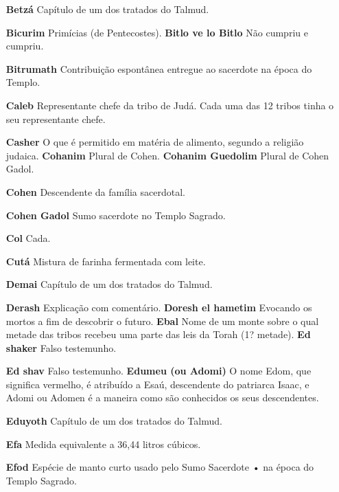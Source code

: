 \begin{itemize}
\begin{enumrate}
\begin{itemize}
\begin{itemize}
\begin{itemize}
\begin{itemize}
\begin{itemize}
\item[\textbf{Betzá}] Capítulo de um dos tratados do Talmud.

\item[\textbf{Bicurim}] Primícias (de Pentecostes). \textbf{Bitlo ve lo Bitlo} Não cumpriu e cumpriu.

\item[\textbf{Bitrumath}]Contribuição espontânea entregue ao sacerdote na época do
Templo.

\item[\textbf{Caleb}] Representante chefe da tribo de Judá. Cada uma das 12
tribos tinha o seu representante chefe.

\item[\textbf{Casher}] O que é permitido em matéria de alimento, segundo a
religião judaica. \textbf{Cohanim} Plural de Cohen. \textbf{Cohanim
Guedolim} Plural de Co­hen Gadol.

\item[\textbf{Cohen}] Descendente da família sacer­dotal.

\item[\textbf{Cohen Gadol}] Sumo sacerdote no Templo Sagrado.

\item[\textbf{Col}] Cada.

\item[\textbf{Cutá}] Mistura de farinha fermentada com leite.

\item[\textbf{Demai}] Capítulo de um dos tratados do Talmud.

\item[\textbf{Derash}] Explicação com comentário. \textbf{Doresh el hametim} Evocando os mortos a fim de descobrir o futuro. \textbf{Ebal} Nome
de um monte sobre o qual metade das tribos recebeu uma parte das leis da
Torah (1? metade). \textbf{Ed shaker} Falso testemunho.

\item[\textbf{Ed shav} Falso testemunho. \textbf{Edumeu (ou Adomi)}] O nome
Edom, que significa vermelho, é atri­buído a Esaú, descendente do
patriar­ca Isaac, e Adomi ou Adomen é a ma­neira como são conhecidos os
seus descendentes.

\item[\textbf{Eduyoth}] Capítulo de um dos trata­dos do Talmud.

\item[\textbf{Efa}] Medida equivalente a 36,44 litros cúbicos.

\item[\textbf{Efod}] Espécie de manto curto usado pelo Sumo Sacerdote • na
época do Templo Sagrado.


\end{itemize}
\end{itemize}
\end{itemize}
\end{itemize}
\end{itemize}
\end{enumrate}
\end{itemize}
